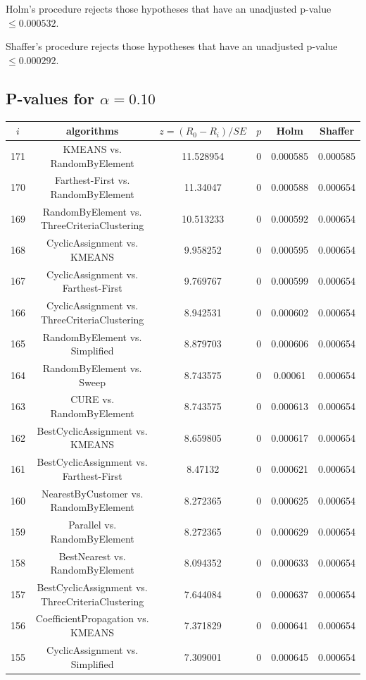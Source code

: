 \documentclass[a4paper,10pt]{article}
\begin{document}
\begin{landscape}
Holm's procedure rejects those hypotheses that have an unadjusted p-value $\le0.000532$.

Shaffer's procedure rejects those hypotheses that have an unadjusted p-value $\le0.000292$.

\pagebreak

\subsection{P-values for $\alpha=0.10$}

\begin{table}[!htp]
\centering\scriptsize
\begin{tabular}{cccccc}
$i$&algorithms&$z=(R_0 - R_i)/SE$&$p$&Holm&Shaffer\\
\hline171&KMEANS vs. RandomByElement&11.528954&0&0.000585&0.000585\\
170&Farthest-First vs. RandomByElement&11.34047&0&0.000588&0.000654\\
169&RandomByElement vs. ThreeCriteriaClustering&10.513233&0&0.000592&0.000654\\
168&CyclicAssignment vs. KMEANS&9.958252&0&0.000595&0.000654\\
167&CyclicAssignment vs. Farthest-First&9.769767&0&0.000599&0.000654\\
166&CyclicAssignment vs. ThreeCriteriaClustering&8.942531&0&0.000602&0.000654\\
165&RandomByElement vs. Simplified&8.879703&0&0.000606&0.000654\\
164&RandomByElement vs. Sweep&8.743575&0&0.00061&0.000654\\
163&CURE vs. RandomByElement&8.743575&0&0.000613&0.000654\\
162&BestCyclicAssignment vs. KMEANS&8.659805&0&0.000617&0.000654\\
161&BestCyclicAssignment vs. Farthest-First&8.47132&0&0.000621&0.000654\\
160&NearestByCustomer vs. RandomByElement&8.272365&0&0.000625&0.000654\\
159&Parallel vs. RandomByElement&8.272365&0&0.000629&0.000654\\
158&BestNearest vs. RandomByElement&8.094352&0&0.000633&0.000654\\
157&BestCyclicAssignment vs. ThreeCriteriaClustering&7.644084&0&0.000637&0.000654\\
156&CoefficientPropagation vs. KMEANS&7.371829&0&0.000641&0.000654\\
155&CyclicAssignment vs. Simplified&7.309001&0&0.000645&0.000654\\

\end{tabular}
\end{table}
\end{landscape}
\end{document}
